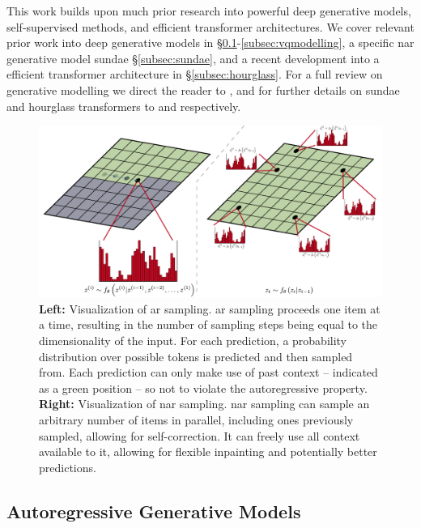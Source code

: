 
This work builds upon much prior research into powerful deep generative models,
self-supervised methods, and efficient transformer architectures. We cover
relevant prior work into deep generative models in
\S\ref{subsec:agm}-\ref{subsec:vqmodelling}, a specific \acrshort{nar}
generative model \gls{sundae} \S\ref{subsec:sundae}, and a recent development
into a efficient transformer architecture in \S\ref{subsec:hourglass}. For a
full review on generative modelling we direct the reader to
\citet{bondtaylor2021review}, and for further details on \gls{sundae} and
hourglass transformers to \citet{savinov2022stepunrolled} and
\citet{nawrot2021hierarchical} respectively.

\begin{figure}[ht!]
    \centering
    \includegraphics[width=\textwidth]{figures/AR-NAR.pdf}
    \caption{
        \textbf{Left:} Visualization of \acrfull{ar} sampling. \gls{ar} sampling
        proceeds one item at a time, resulting in the number of sampling steps
        being equal to the dimensionality of the input. For each prediction, a
        probability distribution over possible tokens is predicted and then
        sampled from. Each prediction can only make use of past context --
        indicated as a green position -- so not to violate the autoregressive
        property.
        \textbf{Right:} Visualization of \acrfull{nar} sampling. \gls{nar}
        sampling can sample an arbitrary number of items in parallel, including
        ones previously sampled, allowing for self-correction. It can freely use
        all context available to it, allowing for flexible inpainting and
        potentially better predictions.
    }
\end{figure}

\subsection{Autoregressive Generative Models}
\label{subsec:agm}

